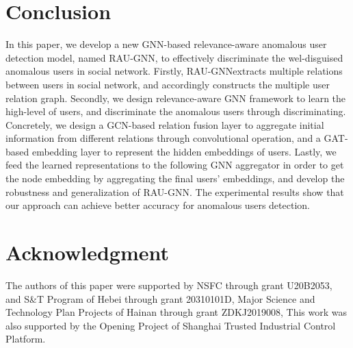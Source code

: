 \documentclass[conference]{IEEEtran}
\theoremstyle{definition}
\newcommand{\model}{\textsc{RAU-GNN}}
\begin{document}
\section{Conclusion}\label{sec:conclusion}
In this paper, we develop a new GNN-based relevance-aware anomalous user detection model, named \model, to effectively discriminate the wel-disguised anomalous users in social network.
Firstly, \model extracts multiple relations between users in social network, and accordingly constructs the multiple user relation graph.
Secondly, we design relevance-aware GNN framework to learn the high-level of users, and discriminate the anomalous users through discriminating. 
Concretely, we design a GCN-based relation fusion layer to aggregate initial information from different relations through convolutional operation, and a GAT-based embedding layer to represent the hidden embeddings of users.
Lastly, we feed the learned representations to the following GNN aggregator in order to get the node embedding by aggregating the final users' embeddings, and develop the robustness and generalization of \model.   The experimental results  show that our approach can achieve better accuracy for anomalous users detection. 

\section*{Acknowledgment}
The authors of this paper were supported by NSFC through grant U20B2053, and S\&T Program of Hebei through grant 20310101D,
Major Science and Technology Plan Projects of Hainan through grant ZDKJ2019008,
This work was also supported by the Opening Project of Shanghai Trusted Industrial Control Platform.




\end{document}
